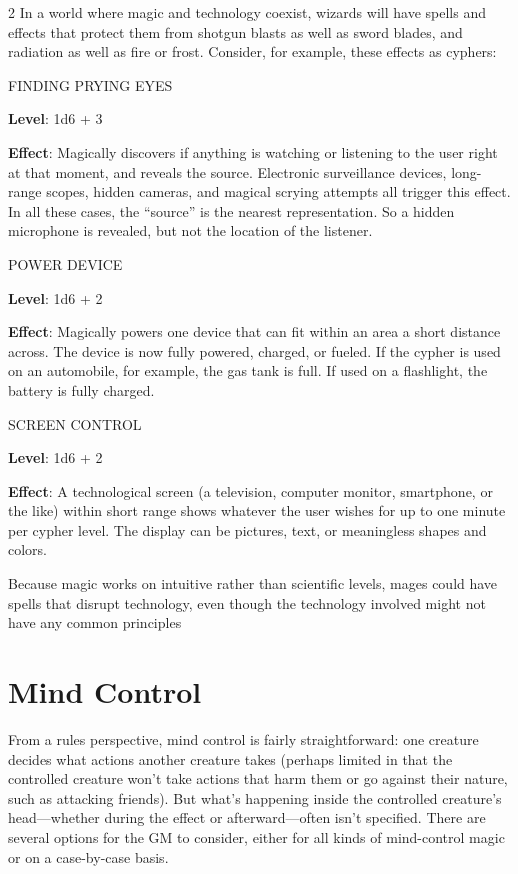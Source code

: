 \begin{multicols}{2}
In a world where magic and technology coexist, wizards will have spells and effects that protect them from shotgun blasts as well as sword blades, and radiation as well as fire or frost. Consider, for example, these effects as cyphers:

FINDING PRYING EYES 

\textbf{Level}: 1d6 + 3 

\textbf{Effect}: Magically discovers if anything is watching or listening to the user right at that moment, and reveals the source. Electronic surveillance devices, long-range scopes, hidden cameras, and magical scrying attempts all trigger this effect. In all these cases, the “source” is the nearest representation. So a hidden microphone is revealed, but not the location of the listener. 

POWER DEVICE 

\textbf{Level}: 1d6 + 2 

\textbf{Effect}: Magically powers one device that can fit within an area a short distance across. The device is now fully powered, charged, or fueled. If the cypher is used on an automobile, for example, the gas tank is full. If used on a flashlight, the battery is fully charged. 

SCREEN CONTROL 

\textbf{Level}: 1d6 + 2 

\textbf{Effect}: A technological screen (a television, computer monitor, smartphone, or the like) within short range shows whatever the user wishes for up to one minute per cypher level. The display can be pictures, text, or meaningless shapes and colors.

Because magic works on intuitive rather than scientific levels, mages could have spells that disrupt technology, even though the technology involved might not have any common principles

\section{Mind Control}

From a rules perspective, mind control is fairly straightforward: one creature decides what actions another creature takes (perhaps limited in that the controlled creature won’t take actions that harm them or go against their nature, such as attacking friends). But what’s happening inside the controlled creature’s head—whether during the effect or afterward—often isn’t specified. There are several options for the GM to consider, either for all kinds of mind-control magic or on a case-by-case basis. 


\end{multicols}
